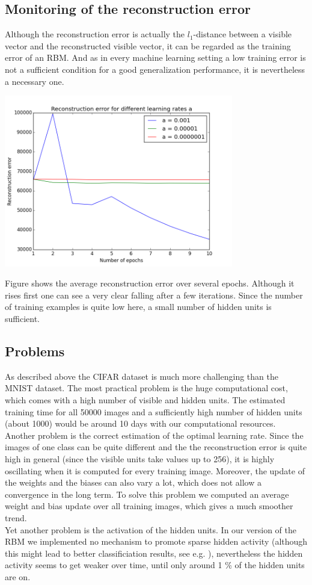 \documentclass[a4paper]{scrartcl}
\begin{document}
\subsection{Monitoring of the reconstruction error}
Although the reconstruction error is actually the $l_1$-distance between a visible vector and the reconstructed visible vector, it can be regarded as the training error of an RBM. And as in every machine learning setting a low training error is not a sufficient condition for a good generalization performance, it is nevertheless a necessary one.
\begin{center}
\includegraphics[width=10cm]{images/cifarreconerr.png}
\end{center} 
Figure shows the average reconstruction error over several epochs. Although it rises first one can see a very clear falling after a few iterations. Since the number of training examples is quite low here, a small number of hidden units is sufficient.
\subsection{Problems}
As described above the CIFAR dataset is much more challenging than the MNIST dataset. The most practical problem is the huge computational cost, which comes with a high number of visible and hidden units. The estimated training time for all 50000 images and a sufficiently high number of hidden units (about 1000) would be around 10 days with our computational resources.\\
Another problem is the correct estimation of the optimal learning rate. Since the images of one class can be quite different and the the reconstruction error is quite high in general (since the visible units take values up to 256), it is highly oscillating when it is computed for every training image. Moreover, the update of the weights and the biases can also vary a lot, which does not allow a convergence in the long term. To solve this problem we computed an average weight and bias update over all training images, which gives a much smoother trend. \\
Yet another problem is the activation of the hidden units. In our version of the RBM we implemented no mechanism to promote sparse hidden activity (although this might lead to better classificiation results, see e.g. \cite{Larochelle}), nevertheless the hidden activity seems to get weaker over time, until only around 1 \% of the hidden units are on.
\newpage
\end{document}
